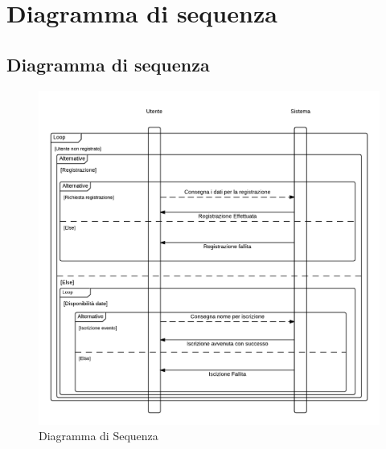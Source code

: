 \chapter{Diagramma di sequenza}
\section{Diagramma di sequenza}
\begin{figure}[H]
	\centering
	\includegraphics[scale=0.30]{img/sequenza.png}
	\caption{Diagramma di Sequenza}
	\label{fig:sequenza}
\end{figure}